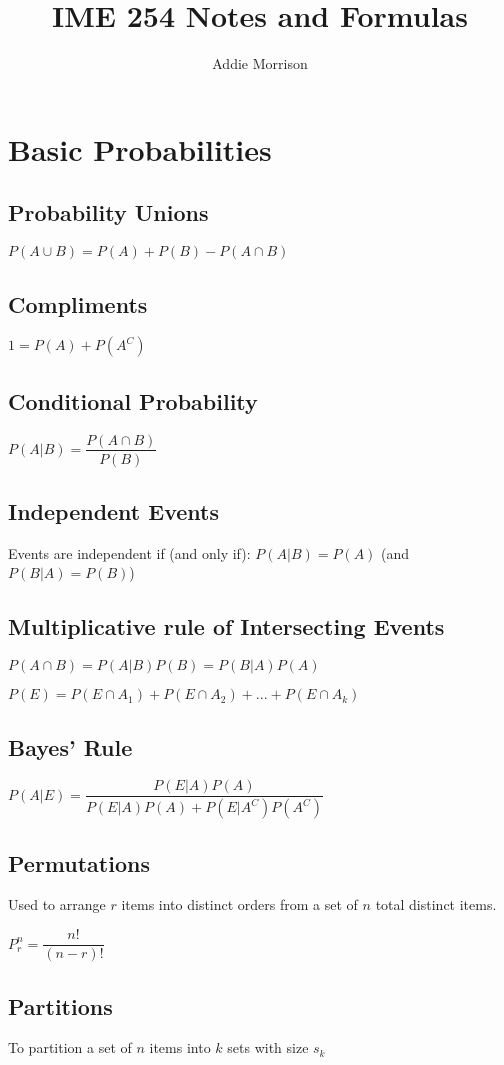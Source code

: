 \documentclass{hitec}
\author{Addie Morrison}
\title{IME 254 Notes and Formulas}
\begin{document}
\maketitle
\section*{Basic Probabilities}
\subsection*{Probability Unions}
$P(A\cup B) = P(A) +P(B)-P(A\cap B)$

\subsection*{Compliments}
$1 = P(A)+P(A^C)$

\subsection*{Conditional Probability}
$P(A|B) = \dfrac{P(A\cap B)}{P(B)}$

\subsection*{Independent Events}
Events are independent if (and only if): $P(A|B) = P(A)$ (and $P(B|A) = P(B)$)

\subsection*{Multiplicative rule of Intersecting Events}
$P(A\cap B) =P(A|B)P(B) = P(B|A)P(A)$

$P(E) = P(E\cap A_1)+P(E\cap A_2)+...+P(E\cap A_k)$

\subsection*{Bayes' Rule}
$P(A|E) = \dfrac{P(E|A)P(A)}{P(E|A)P(A)+P(E|A^C)P(A^C)}$

\subsection*{Permutations}
Used to arrange $r$ items into distinct orders from a set of $n$ total distinct items.

$P^n_r = \dfrac{n!}{(n-r)!}$

\subsection*{Partitions}
To partition a set of $n$ items into $k$ sets with size $s_k$
\end{document}
